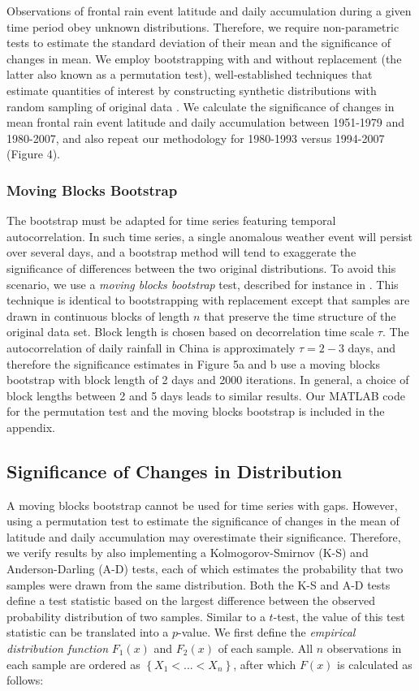 \documentclass[singlecolumn,11pt]{pnas-new}
\begin{document}
	Observations of frontal rain event latitude and daily accumulation during a given time period obey unknown distributions. Therefore, we require non-parametric tests to estimate the standard deviation of their mean and the significance of changes in mean. We employ bootstrapping with and without replacement (the latter also known as a permutation test), well-established techniques that estimate quantities of interest by constructing synthetic distributions with random sampling of original data \citep{Good2005}. We calculate the significance of changes in mean frontal rain event latitude and daily accumulation between 1951-1979 and 1980-2007, and also repeat our methodology for 1980-1993 versus 1994-2007 (Figure 4).

\subsubsection{Moving Blocks Bootstrap}	
	
	The bootstrap must be adapted for time series featuring temporal autocorrelation. In such time series, a single anomalous weather event will persist over several days, and a bootstrap method will tend to exaggerate the significance of differences between the two original distributions. To avoid this scenario, we use a \textit{moving blocks bootstrap} test, described for instance in \cite{Singh2014}. This technique is identical to bootstrapping with replacement except that samples are drawn in continuous blocks of length $n$ that preserve the time structure of the original data set. Block length is chosen based on decorrelation time scale $\tau$. The autocorrelation of daily rainfall in China is approximately $\tau =2-3$ days, and therefore the significance estimates in Figure 5a and b use a moving blocks bootstrap with block length of 2 days and 2000 iterations. In general, a choice of block lengths between 2 and 5 days leads to similar results. Our MATLAB code for the permutation test and the moving blocks bootstrap is included in the appendix.
	
\subsection{Significance of Changes in Distribution}

	A moving blocks bootstrap cannot be used for time series with gaps. However, using a permutation test to estimate the significance of changes in the mean of latitude and daily accumulation may overestimate their significance. Therefore, we verify results by also implementing a Kolmogorov-Smirnov (K-S) and Anderson-Darling (A-D) tests, each of which estimates the probability that two samples were drawn from the same distribution. Both the K-S and A-D tests define a test statistic based on the largest difference between the observed probability distribution of two samples. Similar to a $t$-test, the value of this test statistic can be translated into a $p$-value. We first define the \textit{empirical distribution function} $F_1(x)$ and $F_2(x)$ of each sample. All $n$ observations in each sample are ordered as $\left\{X_1 < ... < X_n\right\}$, after which $F(x)$ is calculated as follows:
\end{document}
